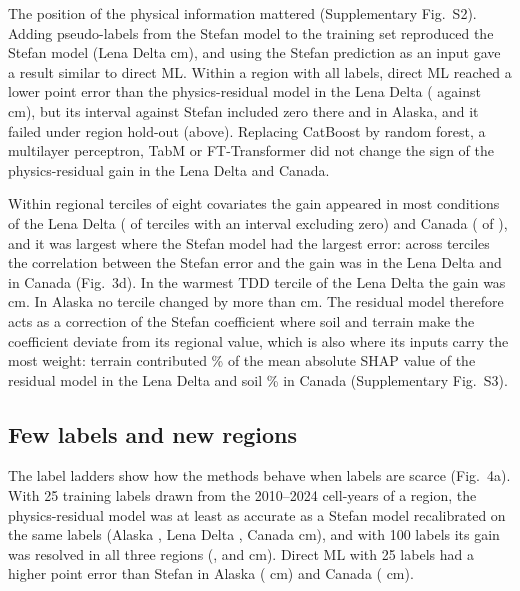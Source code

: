 The position of the physical information mattered (Supplementary Fig.~S2). Adding pseudo-labels from the Stefan model to the training set reproduced the Stefan model (Lena Delta \ndrefLeblkDo{} cm), and using the Stefan prediction as an input gave a result similar to direct ML. Within a region with all labels, direct ML reached a lower point error than the physics-residual model in the Lena Delta (\nrmseLeblkDz{} against \nrmseLeblkRo{} cm), but its interval against Stefan included zero there and in Alaska, and it failed under region hold-out (above). Replacing CatBoost by random forest, a multilayer perceptron, TabM or FT-Transformer did not change the sign of the physics-residual gain in the Lena Delta and Canada.

Within regional terciles of eight covariates the gain appeared in most conditions of the Lena Delta (\ngcLesig{} of \ngcLecells{} terciles with an interval excluding zero) and Canada (\ngcCasig{} of \ngcCacells), and it was largest where the Stefan model had the largest error: across terciles the correlation between the Stefan error and the gain was \ngcLecorr{} in the Lena Delta and \ngcCacorr{} in Canada (Fig.~3d). In the warmest TDD tercile of the Lena Delta the gain was \ndtddLewarm{} cm. In Alaska no tercile changed by more than \ngcAkmaxabs{} cm. The residual model therefore acts as a correction of the Stefan coefficient where soil and terrain make the coefficient deviate from its regional value, which is also where its inputs carry the most weight: terrain contributed \nshapLeResTerrain\% of the mean absolute SHAP value of the residual model in the Lena Delta and soil \nshapCaResSoil\% in Canada (Supplementary Fig.~S3).

\subsection{Few labels and new regions}
The label ladders show how the methods behave when labels are scarce (Fig.~4a). With 25 training labels drawn from the 2010--2024 cell-years of a region, the physics-residual model was at least as accurate as a Stefan model recalibrated on the same labels (Alaska \nllAkRotwfive, Lena Delta \nllLeRotwfive, Canada \nllCaRotwfive{} cm), and with 100 labels its gain was resolved in all three regions (\nllAkRohundred, \nllLeRohundred{} and \nllCaRohundred{} cm). Direct ML with 25 labels had a higher point error than Stefan in Alaska (\nllAkDztwfive{} cm) and Canada (\nllCaDztwfive{} cm).

